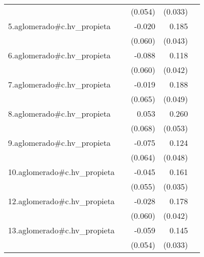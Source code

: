 {\begin{longtable}{l*{4}{D{.}{.}{-1}}}
            &                     &     (0.054)         &     (0.033)         &                     \\
\addlinespace
5.aglomerado#c.hv\_propieta&                     &      -0.020         &       0.185\sym{***}&                     \\
            &                     &     (0.060)         &     (0.043)         &                     \\
\addlinespace
6.aglomerado#c.hv\_propieta&                     &      -0.088         &       0.118\sym{**} &                     \\
            &                     &     (0.060)         &     (0.042)         &                     \\
\addlinespace
7.aglomerado#c.hv\_propieta&                     &      -0.019         &       0.188\sym{***}&                     \\
            &                     &     (0.065)         &     (0.049)         &                     \\
\addlinespace
8.aglomerado#c.hv\_propieta&                     &       0.053         &       0.260\sym{***}&                     \\
            &                     &     (0.068)         &     (0.053)         &                     \\
\addlinespace
9.aglomerado#c.hv\_propieta&                     &      -0.075         &       0.124\sym{*}  &                     \\
            &                     &     (0.064)         &     (0.048)         &                     \\
\addlinespace
10.aglomerado#c.hv\_propieta&                     &      -0.045         &       0.161\sym{***}&                     \\
            &                     &     (0.055)         &     (0.035)         &                     \\
\addlinespace
12.aglomerado#c.hv\_propieta&                     &      -0.028         &       0.178\sym{***}&                     \\
            &                     &     (0.060)         &     (0.042)         &                     \\
\addlinespace
13.aglomerado#c.hv\_propieta&                     &      -0.059         &       0.145\sym{***}&                     \\
            &                     &     (0.054)         &     (0.033)         &                     \\

\end{longtable}}
